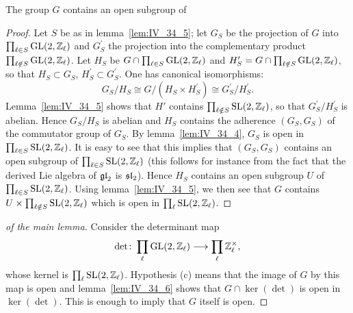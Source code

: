 \begin{lem}\label{lem:IV_34_6}
	The group $G$ contains an open subgroup of
\end{lem}
\begin{proof}
	Let $S$ be as in lemma~\ref{lem:IV_34_5}; let $G_S$ be the projection
	of $G$ into $\prod_{\ell\in S} \operatorname{GL}(2, \mathbb{Z}_\ell)$ and $G^\prime_S$ the
	projection into the complementary product $\prod_{\ell\notin S} \operatorname{GL}(2,
	\mathbb{Z}_\ell)$. Let $H_S$ be $G \cap \prod_{\ell\in S} \operatorname{GL}(2, \mathbb{Z}_\ell)$ and
	$H^\prime_S = G \cap \prod_{\ell\notin S} \operatorname{GL}(2, \mathbb{Z}_\ell)$, so that
	$H_S \subset G_S$, $H^\prime_S \subset G^\prime_S$. One has canonical
	isomorphisms:
	\dpage
	\[
		G_S/H_S \cong G/(H_S \times H_S^\prime) \cong
		G_S^\prime/H_S^\prime.
	\]
	Lemma~\ref{lem:IV_34_5} shows that $H'$ contains $\prod_{\ell\notin S}
	\operatorname{SL}(2, \mathbb{Z}_\ell)$, so that $G_S^\prime/H_S^\prime$ is abelian. Hence
	$G_S/H_S$ is abelian and $H_S$ contains the adherence $(G_S, G_S)$ of
	the commutator group of $G_S$. By lemma~\ref{lem:IV_34_4}, $G_S$ is
	open in $\prod_{\ell\in S} \operatorname{SL}(2, \mathbb{Z}_\ell)$. It is easy to see that
	this implies that $(G_S, G_S)$ contains an open subgroup of
	$\prod_{\ell\in S} \operatorname{SL}(2, \mathbb{Z}_\ell)$ (this follows for instance from the
	fact that the derived Lie algebra of $\operatorname{\mathfrak{gl}}_2$ is $\operatorname{\mathfrak{sl}}_2$). Hence $H_S$
	contains an open subgroup $U$ of $\prod_{\ell\in S} \operatorname{SL}(2, \mathbb{Z}_\ell)$.
	Using lemma~\ref{lem:IV_34_5}, we then see that $G$ contains $U \times
	\prod_{\ell\notin S} \operatorname{SL}(2, \mathbb{Z}_\ell)$ which is open in $\prod_\ell
	\operatorname{SL}(2, \mathbb{Z}_\ell)$.
\end{proof}

\begin{proof}[ of the main lemma]
	Consider the determinant map
	\[
		\det\colon \prod_{\ell} \operatorname{GL}(2, \mathbb{Z}_\ell) \longrightarrow
		\prod_{\ell} \mathbb{Z}_\ell^\times,
	\]
	whose kernel is $\prod_\ell \operatorname{SL}(2, \mathbb{Z}_\ell)$. Hypothesis (c) means that
	the image of $G$ by this map is open and lemma~\ref{lem:IV_34_6} shows
	that $G \cap \ker(\det)$ is open in $\ker(\det)$. This is enough to
	imply that $G$ itself is open.
\end{proof}

